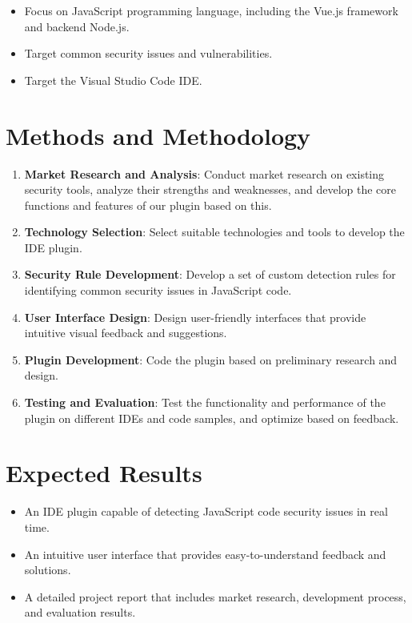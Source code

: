 \documentclass{proposal}
\begin{document}
\begin{itemize}
    \item Focus on JavaScript programming language, including the Vue.js framework and backend Node.js.
    \item Target common security issues and vulnerabilities.
    \item Target the Visual Studio Code IDE.
\end{itemize}

\section{Methods and Methodology}

\begin{enumerate}
    \item \textbf{Market Research and Analysis}: Conduct market research on existing security tools, analyze their strengths and weaknesses, and develop the core functions and features of our plugin based on this.
    \item \textbf{Technology Selection}: Select suitable technologies and tools to develop the IDE plugin.
    \item \textbf{Security Rule Development}: Develop a set of custom detection rules for identifying common security issues in JavaScript code.
    \item \textbf{User Interface Design}: Design user-friendly interfaces that provide intuitive visual feedback and suggestions.
    \item \textbf{Plugin Development}: Code the plugin based on preliminary research and design.
    \item \textbf{Testing and Evaluation}: Test the functionality and performance of the plugin on different IDEs and code samples, and optimize based on feedback.
\end{enumerate}

\section{Expected Results}

\begin{itemize}
    \item An IDE plugin capable of detecting JavaScript code security issues in real time.
    \item An intuitive user interface that provides easy-to-understand feedback and solutions.
    \item A detailed project report that includes market research, development process, and evaluation results.
\end{itemize}
\end{document}
